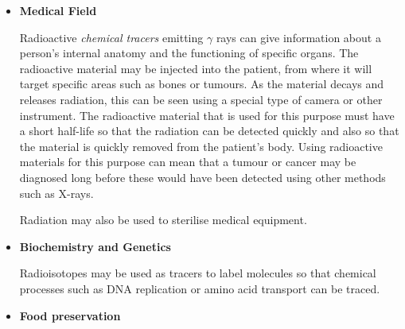 \begin{itemize}
\item{\textbf{Medical Field}}

Radioactive \textit{chemical tracers} emitting $\gamma$ rays can give information about a person's internal anatomy and the functioning of specific organs. The radioactive material may be injected into the patient, from where it will target specific areas such as bones or tumours. As the material decays and releases radiation, this can be seen using a special type of camera or other instrument. The radioactive material that is used for this purpose must have a short half-life so that the radiation can be detected quickly and also so that the material is quickly removed from the patient's body.
Using radioactive materials for this purpose can mean that a tumour or cancer may be diagnosed long before these would have been detected using other methods such as X-rays.

Radiation may also be used to sterilise medical equipment.


\item{\textbf{Biochemistry and Genetics}}

Radioisotopes may be used as tracers to label molecules so that chemical processes such as DNA replication or amino acid transport can be traced.

\item{\textbf{Food preservation}}


\end{itemize}
